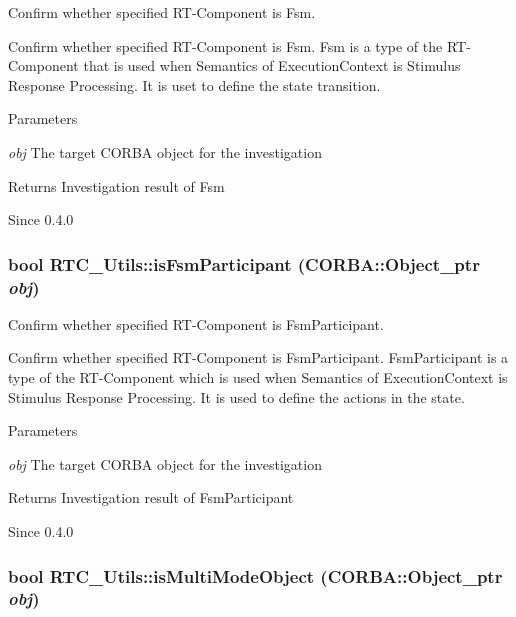 Confirm whether specified RT-\/Component is Fsm. 

Confirm whether specified RT-\/Component is Fsm. Fsm is a type of the RT-\/Component that is used when Semantics of ExecutionContext is Stimulus Response Processing. It is uset to define the state transition.


\begin{DoxyParams}{Parameters}
\item[{\em obj}]The target CORBA object for the investigation\end{DoxyParams}
\begin{DoxyReturn}{Returns}
Investigation result of Fsm
\end{DoxyReturn}
\begin{DoxySince}{Since}
0.4.0 
\end{DoxySince}
\subsubsection[{isFsmParticipant}]{\setlength{\rightskip}{0pt plus 5cm}bool RTC\_\-Utils::isFsmParticipant (CORBA::Object\_\-ptr {\em obj})}\label{namespaceRTC__Utils_a52ff8d6e964922f9673ca78830650e3e}


Confirm whether specified RT-\/Component is FsmParticipant. 

Confirm whether specified RT-\/Component is FsmParticipant. FsmParticipant is a type of the RT-\/Component which is used when Semantics of ExecutionContext is Stimulus Response Processing. It is used to define the actions in the state.


\begin{DoxyParams}{Parameters}
\item[{\em obj}]The target CORBA object for the investigation\end{DoxyParams}
\begin{DoxyReturn}{Returns}
Investigation result of FsmParticipant
\end{DoxyReturn}
\begin{DoxySince}{Since}
0.4.0 
\end{DoxySince}
\subsubsection[{isMultiModeObject}]{\setlength{\rightskip}{0pt plus 5cm}bool RTC\_\-Utils::isMultiModeObject (CORBA::Object\_\-ptr {\em obj})}\label{namespaceRTC__Utils_ae4b1334407be2113a145ee2cf06e3775}


